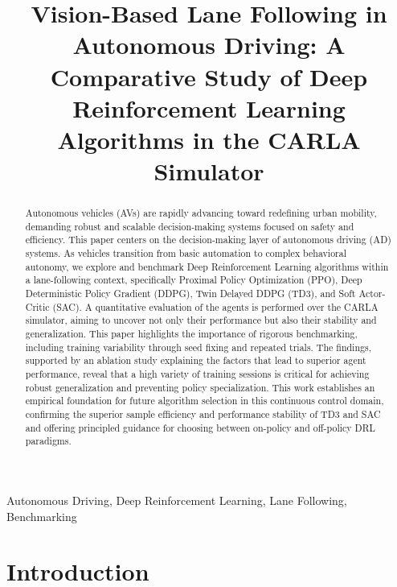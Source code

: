 \documentclass[]{interact}
\begin{document}

\title{Vision-Based Lane Following in Autonomous Driving: A Comparative Study of Deep Reinforcement Learning Algorithms in the CARLA Simulator}

\author{
}

\maketitle

\begin{abstract}
Autonomous vehicles (AVs) are rapidly advancing toward redefining urban mobility, demanding robust and scalable decision-making systems focused on safety and efficiency. This paper centers on the decision-making layer of autonomous driving (AD) systems. As vehicles transition from basic automation to complex behavioral autonomy, we explore and benchmark Deep Reinforcement Learning algorithms within a lane-following context, specifically Proximal Policy Optimization (PPO), Deep Deterministic Policy Gradient (DDPG), Twin Delayed DDPG (TD3), and Soft Actor-Critic (SAC). A quantitative evaluation of the agents is performed over the CARLA simulator, aiming to uncover not only their performance but also their stability and generalization. This paper highlights the importance of rigorous benchmarking, including training variability through seed fixing and repeated trials. The findings, supported by an ablation study explaining the factors that lead to superior agent performance, reveal that a high variety of training sessions is critical for achieving robust generalization and preventing policy specialization. This work establishes an empirical foundation for future algorithm selection in this continuous control domain, confirming the superior sample efficiency and performance stability of TD3 and SAC and offering principled guidance for choosing between on-policy and off-policy DRL paradigms.
\end{abstract}

\begin{keywords}
Autonomous Driving,
Deep Reinforcement Learning,
Lane Following,
Benchmarking
\end{keywords}

\section{Introduction}
\end{document}
